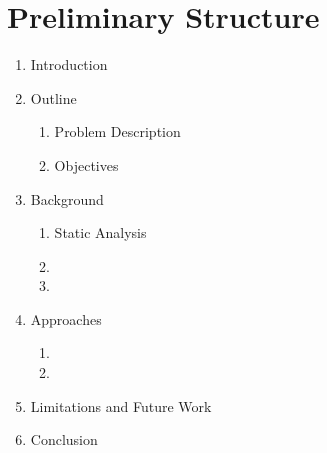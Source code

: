 \chapter{Preliminary Structure}
\label{ch:preliminarystructure}

\renewcommand\theenumii{\theenumi.\arabic{enumii}}
\renewcommand\labelenumii{\theenumii}

	\begin{enumerate}
		\item Introduction
		\item Outline
		\begin{enumerate}
			\item Problem Description
			\item Objectives
		\end{enumerate}
		\item Background
		\begin{enumerate}
			\item Static Analysis
			\item 
			\item
		\end{enumerate}
		\item Approaches
		\begin{enumerate}
			\item 
			\item 
		\end{enumerate}
		\item Limitations and Future Work
		\item Conclusion
	\end{enumerate}
	
